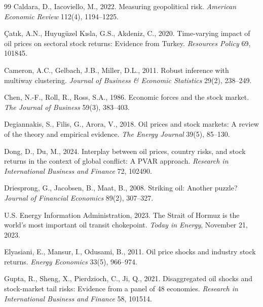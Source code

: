 \documentclass[12pt,preprint,authoryear]{elsarticle}
\begin{document}
\begin{thebibliography}{99}
Caldara, D., Iacoviello, M., 2022. Measuring geopolitical risk. \textit{American Economic Review} 112(4), 1194--1225.

{\c{C}}at{\i}k, A.N., Huyug\"{u}zel K{\i}sla, G.S., Akdeniz, C., 2020. Time-varying impact of oil prices on sectoral stock returns: Evidence from Turkey. \textit{Resources Policy} 69, 101845.

Cameron, A.C., Gelbach, J.B., Miller, D.L., 2011. Robust inference with multiway clustering. \textit{Journal of Business \& Economic Statistics} 29(2), 238--249.

Chen, N.-F., Roll, R., Ross, S.A., 1986. Economic forces and the stock market. \textit{The Journal of Business} 59(3), 383--403.

Degiannakis, S., Filis, G., Arora, V., 2018. Oil prices and stock markets: A review of the theory and empirical evidence. \textit{The Energy Journal} 39(5), 85--130.

Dong, D., Du, M., 2024. Interplay between oil prices, country risks, and stock returns in the context of global conflict: A PVAR approach. \textit{Research in International Business and Finance} 72, 102490.

Driesprong, G., Jacobsen, B., Maat, B., 2008. Striking oil: Another puzzle? \textit{Journal of Financial Economics} 89(2), 307--327.

{U.S. Energy Information Administration}, 2023. The Strait of Hormuz is the world's most important oil transit chokepoint. \textit{Today in Energy}, November 21, 2023.

Elyasiani, E., Mansur, I., Odusami, B., 2011. Oil price shocks and industry stock returns. \textit{Energy Economics} 33(5), 966--974.

Gupta, R., Sheng, X., Pierdzioch, C., Ji, Q., 2021. Disaggregated oil shocks and stock-market tail risks: Evidence from a panel of 48 economies. \textit{Research in International Business and Finance} 58, 101514.


\end{thebibliography}
\end{document}
